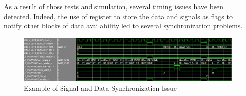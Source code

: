 As a result of those tests and simulation, several timing issues have been detected. Indeed, the use of register to store the data and signals as flags to notify other blocks of data availability led to several synchronization problems. 

\begin{figure}[H]
    \centering
    \hspace*{-30mm}\includegraphics[scale = 0.4]{Figures/LF_timing_issue.png}
    \caption{Example of Signal and Data Synchronization Issue}
    \label{fig:lf_timing}
\end{figure}